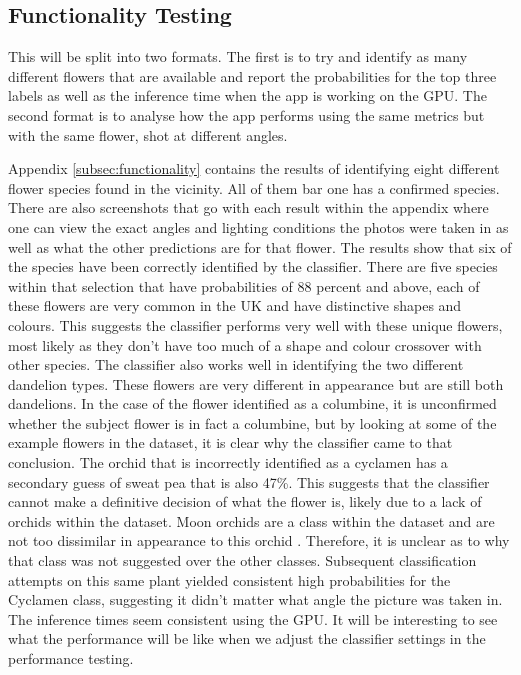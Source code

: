 \documentclass[12pt,a4paper]{report}
\begin{document}
\subsection{Functionality Testing}

This will be split into two formats. The first is to try and identify as many different flowers that are available 
and report the probabilities for the top three labels as well as the inference time when the app is working on the GPU. 
The second format is to analyse how the app performs using the same metrics but with the same flower, shot at different 
angles.

Appendix \ref{subsec:functionality} contains the results of identifying eight different flower species found in the 
vicinity. All of them bar 
one has a confirmed species. There are also screenshots that go with each result within the appendix where one can view 
the exact angles and lighting conditions the photos were taken in as well as what the other predictions are for that 
flower. The results show that six of the species have been correctly identified by the classifier. There are five 
species within that selection that have probabilities of 88 percent and above, each of these flowers are very common in 
the UK and have distinctive shapes and colours. This suggests the classifier performs very well with these unique 
flowers, most likely as they don't have too much of a shape and colour crossover with other species. The classifier also
works well in identifying the two different dandelion types. These flowers are very different in appearance but are 
still both dandelions. In the case of the flower identified as a columbine, it is unconfirmed whether the subject 
flower is in fact a columbine, but by looking at some of the example flowers in the dataset, it is clear why the 
classifier came to that conclusion. The orchid that is incorrectly identified as a cyclamen has a secondary guess of 
sweat pea that is also 47\%. This suggests that the classifier cannot make a definitive decision of what the flower is,
likely due to a lack of orchids within the dataset. Moon orchids are a class within the dataset and are not too 
dissimilar in appearance to this orchid \citep{PlantsState}. Therefore, it is unclear as to why that class was not 
suggested over the other classes. Subsequent classification attempts on this same plant yielded consistent high 
probabilities for the Cyclamen class, suggesting it didn't matter what angle the picture was taken in. The inference 
times seem consistent using the GPU. It will be interesting to see what the performance will be like when we adjust the 
classifier settings in the performance testing.
\end{document}
